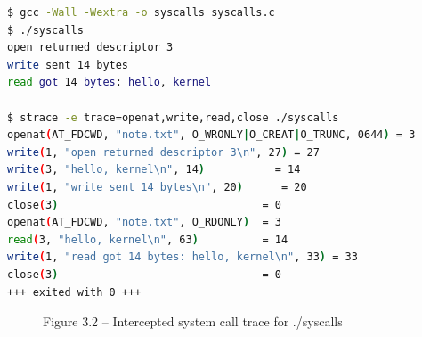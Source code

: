 \documentclass[12pt,a4paper]{report}
\numberwithin{equation}{chapter}
\numberwithin{figure}{chapter}
\numberwithin{table}{chapter}
\begin{document}
\begin{lstlisting}[language=bash]
$ gcc -Wall -Wextra -o syscalls syscalls.c
$ ./syscalls
open returned descriptor 3
write sent 14 bytes
read got 14 bytes: hello, kernel

$ strace -e trace=openat,write,read,close ./syscalls
openat(AT_FDCWD, "note.txt", O_WRONLY|O_CREAT|O_TRUNC, 0644) = 3
write(1, "open returned descriptor 3\n", 27) = 27
write(3, "hello, kernel\n", 14)           = 14
write(1, "write sent 14 bytes\n", 20)      = 20
close(3)                                = 0
openat(AT_FDCWD, "note.txt", O_RDONLY)  = 3
read(3, "hello, kernel\n", 63)          = 14
write(1, "read got 14 bytes: hello, kernel\n", 33) = 33
close(3)                                = 0
+++ exited with 0 +++
\end{lstlisting}

\begin{figure}[H]
\centering
\caption{Figure 3.2 -- Intercepted system call trace for ./syscalls}
\end{figure}
\end{document}
